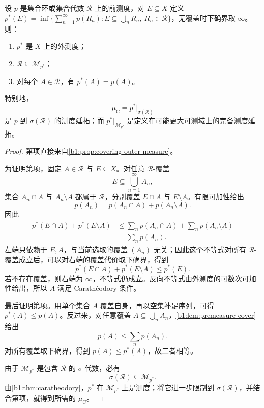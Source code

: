 \begin{theorem}[Carathéodory 延拓]
\label{b1:thm:caratheodory-extension}
设 \(p\) 是集合环或集合代数 \(\mathcal R\) 上的前测度，对 \(E\subseteq X\) 定义 \(p^*(E)=\inf\{\sum_{n=1}^\infty p(R_n):E\subseteq\bigcup_nR_n,\ R_n\in\mathcal R\}\)，无覆盖时下确界取 \(\infty\)。则：
\begin{enumerate}
  \item\label{b1:item:extension-outer} \(p^*\) 是 \(X\) 上的外测度；
  \item\label{b1:item:extension-ring-measurable} \(\mathcal R\subseteq\mathcal M_{p^*}\)；
  \item\label{b1:item:extension-agrees} 对每个 \(A\in\mathcal R\)，有 \(p^*(A)=p(A)\)。
\end{enumerate}
特别地，
\[
\mu_{\mathrm C}=p^*|_{\sigma(\mathcal R)}
\]
是 \(p\) 到 \(\sigma(\mathcal R)\) 的测度延拓；而 \(p^*|_{\mathcal M_{p^*}}\) 是定义在可能更大可测域上的完备测度延拓。
\end{theorem}
\begin{proof}
第项直接来自\cref{b1:prop:covering-outer-measure}。

为证明第项，固定 \(A\in\mathcal R\) 与 \(E\subseteq X\)。对任意 \(\mathcal R\)-覆盖
\[
E\subseteq\bigcup_{n=1}^{\infty}A_n,
\]
集合 \(A_n\cap A\) 与 \(A_n\setminus A\) 都属于 \(\mathcal R\)，分别覆盖 \(E\cap A\) 与 \(E\setminus A\)。有限可加性给出
\[
p(A_n)=p(A_n\cap A)+p(A_n\setminus A).
\]
因此
\begin{align*}
p^*(E\cap A)+p^*(E\setminus A)
&\leq\sum_np(A_n\cap A)+\sum_np(A_n\setminus A)\\
&=\sum_np(A_n).
\end{align*}
左端只依赖于 \(E,A\)，与当前选取的覆盖 \((A_n)\) 无关；因此这个不等式对所有 \(\mathcal R\)-覆盖成立后，可以对右端的覆盖代价取下确界，得到
\[
p^*(E\cap A)+p^*(E\setminus A)\leq p^*(E).
\]
若不存在覆盖，则右端为 \(\infty\)，不等式仍成立。反向不等式由外测度的可数次可加性给出，所以 \(A\) 满足 Carathéodory 条件。

最后证明第项。用单个集合 \(A\) 覆盖自身，再以空集补足序列，可得 \(p^*(A)\leq p(A)\)。反过来，对任意覆盖 \(A\subseteq\bigcup_nA_n\)，\cref{b1:lem:premeasure-cover}给出
\[
p(A)\leq\sum_np(A_n).
\]
对所有覆盖取下确界，得到 \(p(A)\leq p^*(A)\)，故二者相等。

由于 \(\mathcal M_{p^*}\) 是包含 \(\mathcal R\) 的 \(\sigma\)-代数，必有
\[
\sigma(\mathcal R)\subseteq\mathcal M_{p^*}.
\]
由\cref{b1:thm:caratheodory}，\(p^*\) 在 \(\mathcal M_{p^*}\) 上是测度；将它进一步限制到 \(\sigma(\mathcal R)\)，并结合第项，就得到所需的 \(\mu_{\mathrm C}\)。
\end{proof}

